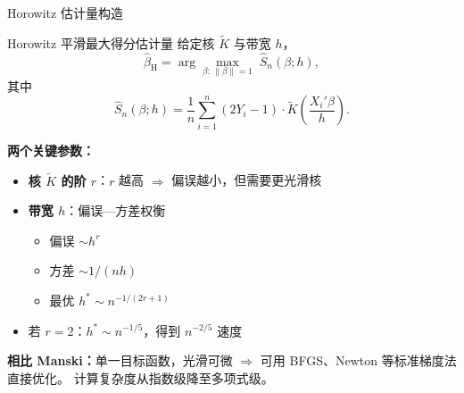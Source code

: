 \documentclass[aspectratio=169, 10pt]{beamer}
\begin{document}
\begin{frame}[shrink=12]{Horowitz 估计量构造}

  \begin{definitionbox}{{Horowitz 平滑最大得分估计量}}
    给定核 $\tilde K$ 与带宽 $h$，
    $$\hat\beta_{\text{H}} = \arg\max_{\beta:\, \|\beta\|=1}
    \;\hat S_n(\beta; h),$$
    其中
    $$\hat S_n(\beta; h) = \frac{1}{n}\sum_{i=1}^n (2Y_i - 1) \cdot
    \tilde K\!\left(\frac{X_i'\beta}{h}\right).$$
  \end{definitionbox}

  \begin{highlightbox}
    \textbf{两个关键参数：}
    \begin{itemize}\setlength{\itemsep}{1pt}
      \item \textbf{核 $\tilde K$ 的阶 $r$}：$r$ 越高 $\Rightarrow$ 偏误越小，但需要更光滑核
      \item \textbf{带宽 $h$}：偏误—方差权衡
      \begin{itemize}\setlength{\itemsep}{1pt}
        \item 偏误 $\sim h^r$
        \item 方差 $\sim 1/(nh)$
        \item 最优 $h^{*} \sim n^{-1/(2r+1)}$
      \end{itemize}
      \item 若 $r = 2$：$h^{*} \sim n^{-1/5}$，得到 $n^{-2/5}$ 速度
    \end{itemize}
  \end{highlightbox}

  \begin{keybox}
    \textbf{相比 Manski：}单一目标函数，光滑可微 $\Rightarrow$
    可用 BFGS、Newton 等标准梯度法直接优化。
    计算复杂度从指数级降至多项式级。
  \end{keybox}

\end{frame}
\end{document}
